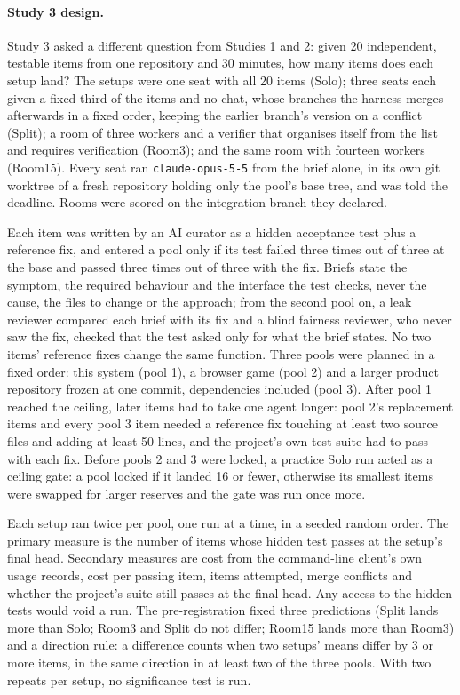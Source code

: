 \paragraph{Study 3 design.}
Study 3 asked a different question from Studies 1 and 2: given 20 independent, testable items from one repository and 30 minutes, how many items does each setup land? The setups were one seat with all 20 items (Solo); three seats each given a fixed third of the items and no chat, whose branches the harness merges afterwards in a fixed order, keeping the earlier branch's version on a conflict (Split); a room of three workers and a verifier that organises itself from the list and requires verification (Room3); and the same room with fourteen workers (Room15). Every seat ran \texttt{claude-opus-5-5} from the brief alone, in its own git worktree of a fresh repository holding only the pool's base tree, and was told the deadline. Rooms were scored on the integration branch they declared.

Each item was written by an AI curator as a hidden acceptance test plus a reference fix, and entered a pool only if its test failed three times out of three at the base and passed three times out of three with the fix. Briefs state the symptom, the required behaviour and the interface the test checks, never the cause, the files to change or the approach; from the second pool on, a leak reviewer compared each brief with its fix and a blind fairness reviewer, who never saw the fix, checked that the test asked only for what the brief states. No two items' reference fixes change the same function. Three pools were planned in a fixed order: this system (pool 1), a browser game (pool 2) and a larger product repository frozen at one commit, dependencies included (pool 3). After pool 1 reached the ceiling, later items had to take one agent longer: pool 2's replacement items and every pool 3 item needed a reference fix touching at least two source files and adding at least 50 lines, and the project's own test suite had to pass with each fix. Before pools 2 and 3 were locked, a practice Solo run acted as a ceiling gate: a pool locked if it landed 16 or fewer, otherwise its smallest items were swapped for larger reserves and the gate was run once more.

Each setup ran twice per pool, one run at a time, in a seeded random order. The primary measure is the number of items whose hidden test passes at the setup's final head. Secondary measures are cost from the command-line client's own usage records, cost per passing item, items attempted, merge conflicts and whether the project's suite still passes at the final head. Any access to the hidden tests would void a run. The pre-registration fixed three predictions (Split lands more than Solo; Room3 and Split do not differ; Room15 lands more than Room3) and a direction rule: a difference counts when two setups' means differ by 3 or more items, in the same direction in at least two of the three pools. With two repeats per setup, no significance test is run.

